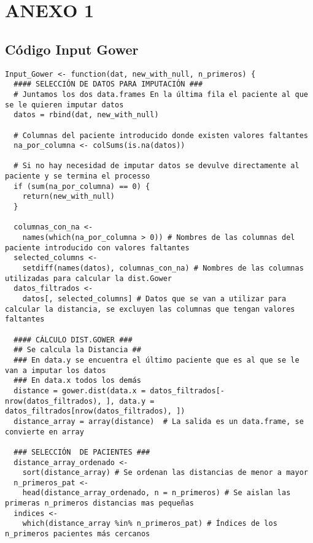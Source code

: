 \section{ANEXO 1}\label{sec:anexo1}


\subsection{Código Input Gower}\label{sec:codigo-input-gower}

\begin{lstlisting}[style=mystyle,caption={Input\_Gower.R}, label={lst:input-gower-fun}]
  Input_Gower <- function(dat, new_with_null, n_primeros) {
  #### SELECCIÓN DE DATOS PARA IMPUTACIÓN ###
  # Juntamos los dos data.frames En la última fila el paciente al que se le quieren imputar datos
  datos = rbind(dat, new_with_null)
  
  # Columnas del paciente introducido donde existen valores faltantes
  na_por_columna <- colSums(is.na(datos))
  
  # Si no hay necesidad de imputar datos se devulve directamente al paciente y se termina el processo
  if (sum(na_por_columna) == 0) {
    return(new_with_null)
  }
  
  columnas_con_na <-
    names(which(na_por_columna > 0)) # Nombres de las columnas del paciente introducido con valores faltantes
  selected_columns <-
    setdiff(names(datos), columnas_con_na) # Nombres de las columnas utilizadas para calcular la dist.Gower
  datos_filtrados <-
    datos[, selected_columns] # Datos que se van a utilizar para calcular la distancia, se excluyen las columnas que tengan valores faltantes
  
  #### CÁLCULO DIST.GOWER ###
  ## Se calcula la Distancia ##
  ### En data.y se encuentra el último paciente que es al que se le van a imputar los datos
  ### En data.x todos los demás
  distance = gower.dist(data.x = datos_filtrados[-nrow(datos_filtrados), ], data.y =  datos_filtrados[nrow(datos_filtrados), ])
  distance_array = array(distance)  # La salida es un data.frame, se convierte en array
  
  ### SELECCIÓN  DE PACIENTES ###
  distance_array_ordenado <-
    sort(distance_array) # Se ordenan las distancias de menor a mayor
  n_primeros_pat <-
    head(distance_array_ordenado, n = n_primeros) # Se aislan las primeras n_primeros distancias mas pequeñas
  indices <-
    which(distance_array %in% n_primeros_pat) # Índices de los n_primeros pacientes más cercanos
  

\end{lstlisting}
